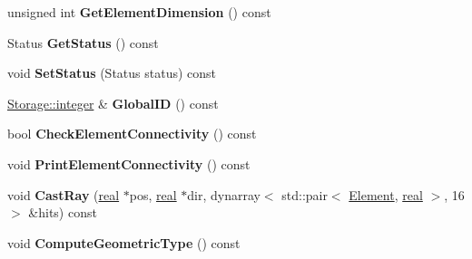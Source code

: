 \begin{DoxyCompactItemize}
\item 
\hypertarget{classINMOST_1_1Element_a59192ab8b9df0e7167731819023152dc}{unsigned int {\bfseries Get\-Element\-Dimension} () const }\label{classINMOST_1_1Element_a59192ab8b9df0e7167731819023152dc}

\item 
\hypertarget{classINMOST_1_1Element_a2ce199aba8ff42ec98e39feb90341283}{Status {\bfseries Get\-Status} () const }\label{classINMOST_1_1Element_a2ce199aba8ff42ec98e39feb90341283}

\item 
\hypertarget{classINMOST_1_1Element_afaae538e1103391e378efcba907aba4e}{void {\bfseries Set\-Status} (Status status) const }\label{classINMOST_1_1Element_afaae538e1103391e378efcba907aba4e}

\item 
\hypertarget{classINMOST_1_1Element_a0dd67d5686fae5c8263f7d31c9f89351}{\hyperlink{classINMOST_1_1Storage_aec96942bc647417a801e2895b45964d2}{Storage\-::integer} \& {\bfseries Global\-I\-D} () const }\label{classINMOST_1_1Element_a0dd67d5686fae5c8263f7d31c9f89351}

\item 
\hypertarget{classINMOST_1_1Element_ad03ef257847cd6ee812e60b00ec5815d}{bool {\bfseries Check\-Element\-Connectivity} () const }\label{classINMOST_1_1Element_ad03ef257847cd6ee812e60b00ec5815d}

\item 
\hypertarget{classINMOST_1_1Element_a494f4593d8a31826d05844f2cb2b58f9}{void {\bfseries Print\-Element\-Connectivity} () const }\label{classINMOST_1_1Element_a494f4593d8a31826d05844f2cb2b58f9}

\item 
\hypertarget{classINMOST_1_1Element_a1d1a89b809462f32ddb67de9fc09a28f}{void {\bfseries Cast\-Ray} (\hyperlink{classINMOST_1_1Storage_a853346784b4a5822a7fac54d8f10f805}{real} $\ast$pos, \hyperlink{classINMOST_1_1Storage_a853346784b4a5822a7fac54d8f10f805}{real} $\ast$dir, dynarray$<$ std\-::pair$<$ \hyperlink{classINMOST_1_1Element}{Element}, \hyperlink{classINMOST_1_1Storage_a853346784b4a5822a7fac54d8f10f805}{real} $>$, 16 $>$ \&hits) const }\label{classINMOST_1_1Element_a1d1a89b809462f32ddb67de9fc09a28f}

\item 
\hypertarget{classINMOST_1_1Element_ade93c392d7815a7ec6e0684b26568562}{void {\bfseries Compute\-Geometric\-Type} () const }\label{classINMOST_1_1Element_ade93c392d7815a7ec6e0684b26568562}


\end{DoxyCompactItemize}
